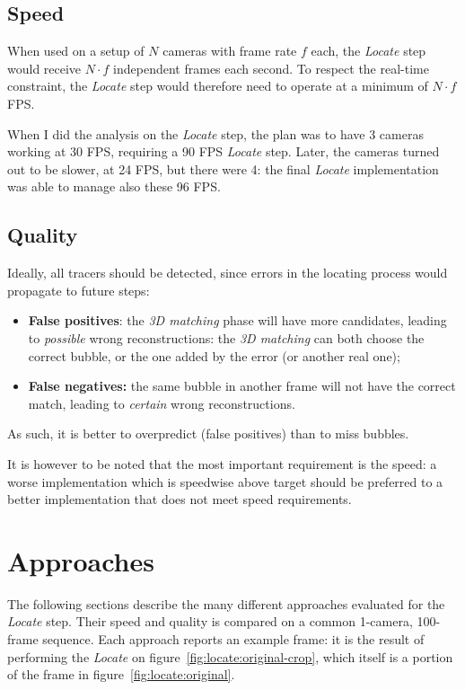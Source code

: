 \subsection{Speed}

When used on a setup of $N$ cameras with frame rate $f$ each, the \textit{Locate} step would receive $N{\cdot}f$ independent frames each second.
To respect the real-time constraint, the \textit{Locate} step would therefore need to operate at a minimum of $N{\cdot}f$ FPS.

When I did the analysis on the \textit{Locate} step, the plan was to have 3 cameras working at 30 FPS, requiring a 90 FPS \textit{Locate} step.
Later, the cameras turned out to be slower, at 24 FPS, but there were 4: the final \textit{Locate} implementation was able to manage also these 96 FPS.

\subsection{Quality}

Ideally, all tracers should be detected, since errors in the locating process would propagate to future steps:
\begin{itemize}
	\itemsep 0em
	\item \textbf{False positives}: the \textit{3D matching} phase will have more candidates, leading to \textit{possible} wrong reconstructions: the \textit{3D matching} can both choose the correct bubble, or the one added by the error (or another real one);
	\item \textbf{False negatives:} the same bubble in another frame will not have the correct match, leading to \textit{certain} wrong reconstructions.
\end{itemize}
As such, it is better to overpredict (false positives) than to miss bubbles.

It is however to be noted that the most important requirement is the speed: a worse implementation which is speedwise above target should be preferred to a better implementation that does not meet speed requirements.

\section{Approaches}

The following sections describe the many different approaches evaluated for the \textit{Locate} step.
Their speed and quality is compared on a common 1-camera, 100-frame sequence.
Each approach reports an example frame: it is the result of performing the \textit{Locate} on figure~\ref{fig:locate:original-crop}, which itself is a portion of the frame in figure~\ref{fig:locate:original}.

